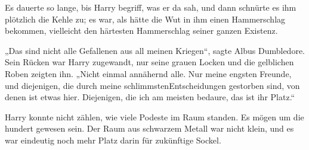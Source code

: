 Es dauerte so lange, bis Harry begriff, was er da sah, und dann schnürte es ihm plötzlich die Kehle zu; es war, als hätte die Wut in ihm einen Hammerschlag bekommen, vielleicht den härtesten Hammerschlag seiner ganzen Existenz.

„Das sind nicht alle Gefallenen aus all meinen Kriegen“, sagte Albus Dumbledore. Sein Rücken war Harry zugewandt, nur seine grauen Locken und die gelblichen Roben zeigten ihn. „Nicht einmal annähernd alle. Nur meine engsten Freunde, und diejenigen, die durch meine schlimmstenEntscheidungen gestorben sind, von denen ist etwas hier. Diejenigen, die ich am meisten bedaure, das ist ihr Platz.“

Harry konnte nicht zählen, wie viele Podeste im Raum standen. Es mögen um die hundert gewesen sein. Der Raum aus schwarzem Metall war nicht klein, und es war eindeutig noch mehr Platz darin für zukünftige Sockel.

